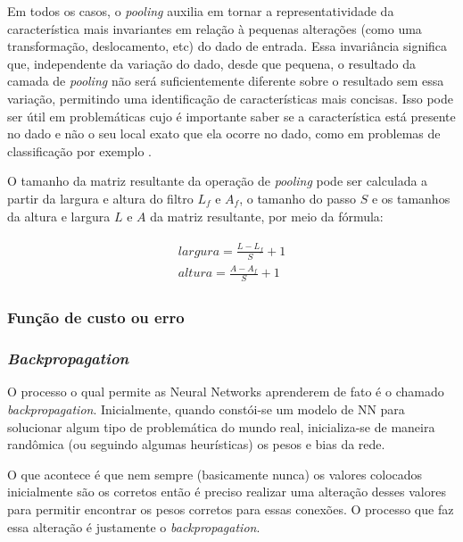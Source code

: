 Em todos os casos, o \textit{pooling} auxilia em tornar a representatividade da característica mais invariantes em relação à pequenas alterações (como uma transformação, deslocamento, etc) do dado de entrada. Essa invariância significa que, independente da variação do dado, desde que pequena, o resultado da camada de \textit{pooling} não será suficientemente diferente sobre o resultado sem essa variação, permitindo uma identificação de características mais concisas. Isso pode ser útil em problemáticas cujo é importante saber se a característica está presente no dado e não o seu local exato que ela ocorre no dado, como em problemas de classificação por exemplo \cite{goodfellow-et-al-2016}.

O tamanho da matriz resultante da operação de \textit{pooling} pode ser calculada a partir da largura e altura do filtro \(L_f\) e \(A_f\), o tamanho do passo \(S\) e os tamanhos da altura e largura \(L\) e \(A\) da matriz resultante, por meio da fórmula:

\begin{gather}
  \begin{split}
    largura = \frac{L - L_f}{S}  + 1 \\
    altura =  \frac{A - A_f}{S} + 1
  \end{split}
  \label{math:size-after-pooling}
\end{gather}

\subsubsection{Função de custo ou erro} \label{sssec:cost-function}

\subsubsection{\textit{Backpropagation}} \label{sssec:backpropagation}

O processo o qual permite as Neural Networks aprenderem de fato é o chamado \textit{backpropagation}. Inicialmente, quando constói-se um modelo de NN para solucionar algum tipo de problemática do mundo real, inicializa-se de maneira randômica (ou seguindo algumas heurísticas) os pesos e bias da rede.

O que acontece é que nem sempre (basicamente nunca) os valores colocados inicialmente são os corretos então é preciso realizar uma alteração desses valores para permitir encontrar os pesos corretos para essas conexões. O processo que faz essa alteração é justamente o \textit{backpropagation}.

